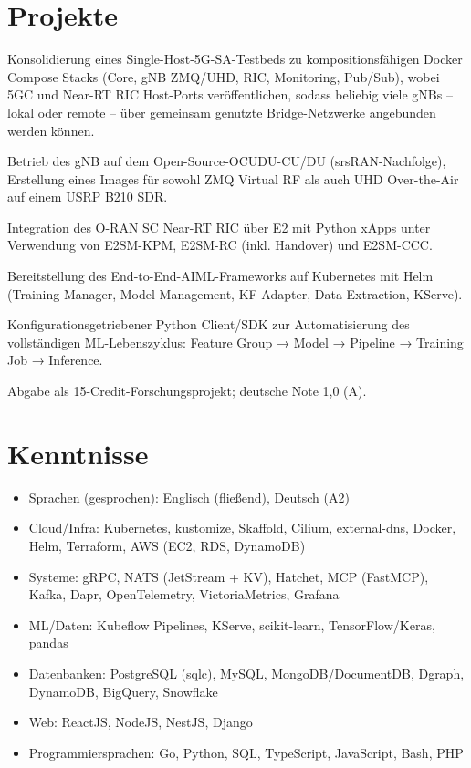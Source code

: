 \documentclass[10pt,a4paper]{resume}
\begin{document}
\section{Projekte}

\bullets
  \item Konsolidierung eines Single-Host-5G-SA-Testbeds zu kompositionsfähigen Docker Compose Stacks (Core, gNB ZMQ/UHD, RIC, Monitoring, Pub/Sub), wobei 5GC und Near-RT RIC Host-Ports veröffentlichen, sodass beliebig viele gNBs – lokal oder remote – über gemeinsam genutzte Bridge-Netzwerke angebunden werden können.
  \item Betrieb des gNB auf dem Open-Source-OCUDU-CU/DU (srsRAN-Nachfolge), Erstellung eines Images für sowohl ZMQ Virtual RF als auch UHD Over-the-Air auf einem USRP B210 SDR.
  \item Integration des O-RAN SC Near-RT RIC über E2 mit Python xApps unter Verwendung von E2SM-KPM, E2SM-RC (inkl. Handover) und E2SM-CCC.
\bulletsend
\vspace{1.0pt}
\bullets
  \item Bereitstellung des End-to-End-AIML-Frameworks auf Kubernetes mit Helm (Training Manager, Model Management, KF Adapter, Data Extraction, KServe).
  \item Konfigurationsgetriebener Python Client/SDK zur Automatisierung des vollständigen ML-Lebenszyklus: Feature Group → Model → Pipeline → Training Job → Inference.
  \item Abgabe als 15-Credit-Forschungsprojekt; deutsche Note 1,0 (A).
\bulletsend

\section{Kenntnisse}

\begin{itemize}[leftmargin=1.4em,nosep,topsep=2pt]
  \item Sprachen (gesprochen): Englisch (fließend), Deutsch (A2)
  \item Cloud/Infra: Kubernetes, kustomize, Skaffold, Cilium, external-dns, Docker, Helm, Terraform, AWS (EC2, RDS, DynamoDB)
  \item Systeme: gRPC, NATS (JetStream + KV), Hatchet, MCP (FastMCP), Kafka, Dapr, OpenTelemetry, VictoriaMetrics, Grafana
  \item ML/Daten: Kubeflow Pipelines, KServe, scikit-learn, TensorFlow/Keras, pandas
  \item Datenbanken: PostgreSQL (sqlc), MySQL, MongoDB/DocumentDB, Dgraph, DynamoDB, BigQuery, Snowflake
  \item Web: ReactJS, NodeJS, NestJS, Django
  \item Programmiersprachen: Go, Python, SQL, TypeScript, JavaScript, Bash, PHP
\end{itemize}
\end{document}
